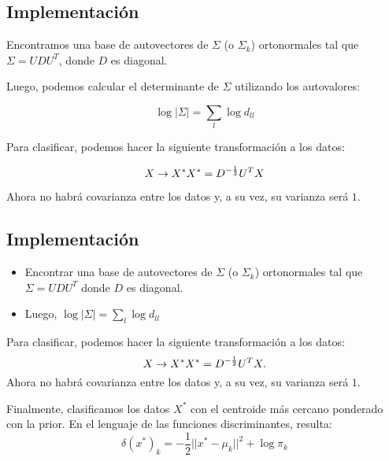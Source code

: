 \documentclass[aps,onecolumn,12pt,notitlepage]{revtex4-1}
\begin{document}
\subsection{Implementación}


Encontramos una base de autovectores de \(\Sigma\) (o \(\Sigma_{k}\)) ortonormales tal que \(\Sigma = UDU^{T}\), donde \(D\) es diagonal.


Luego, podemos calcular el determinante de \(\Sigma\) utilizando los autovalores:

\begin{equation}
\log |\Sigma| = \sum_{l} \log d_{ll}
\end{equation}


Para clasificar, podemos hacer la siguiente transformación a los datos:

\begin{equation}
X \rightarrow X^{*}\\
X^{*} = D^{-\frac{1}{2}}U^{T}X
\end{equation}

Ahora no habrá covarianza entre los datos y, a su vez, su varianza será \(1\).

\subsection{Implementación}

\begin{itemize}
    \item Encontrar una base de autovectores de $\Sigma$ (o $\Sigma_{k}$) ortonormales tal que $\Sigma = UDU^{T}$ donde $D$ es diagonal.
    \item Luego, $\log |\Sigma|  = \sum_{l} \log d_{ll}$
\end{itemize}

Para clasificar, podemos hacer la siguiente transformación a los datos: 
\begin{equation}
X \rightarrow X^{*}\\
X^{*} = D^{-\frac{1}{2}}U^{T}X. 
\end{equation}
Ahora no habrá covarianza entre los datos y, a su vez, su varianza será $1$.

Finalmente, clasificamos los datos $X^{*}$ con el centroide más cercano ponderado con la prior. En el lenguaje de las funciones discriminantes, resulta:
\begin{equation}
\delta(x^{*})_{k} = -\frac{1}{2}||x^{*}-\mu_{k}||^{2} + \log \pi_{k}
\end{equation}
\end{document}
